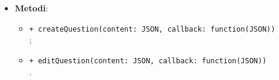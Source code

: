 \begin{itemize}
\begin{itemize}
\begin{itemize}
		\end{itemize}
	\end{itemize}
\item \textbf{Metodi}:
	\begin{itemize}
	\item \texttt{+ createQuestion(content: JSON, callback: function(JSON))} \\
	;   
	\item \texttt{+ editQuestion(content: JSON, callback: function(JSON))} \\
	.
	\end{itemize}
\end{itemize}